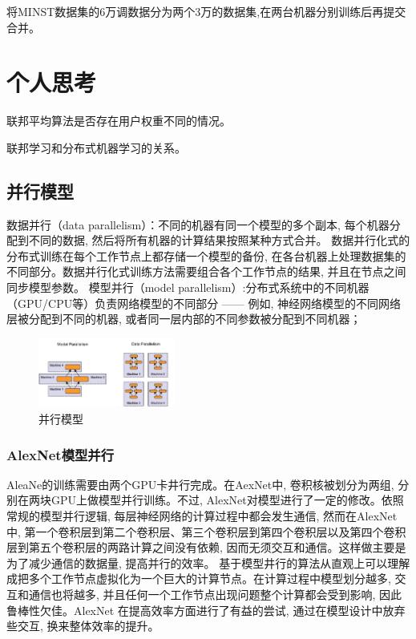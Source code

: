 \documentclass[a4paper]{article}
\begin{document}
将MINST数据集的6万调数据分为两个3万的数据集,在两台机器分别训练后再提交合并。
 
\section{个人思考}
联邦平均算法是否存在用户权重不同的情况。

联邦学习和分布式机器学习的关系。


\subsection{并行模型}

数据并行（data parallelism）：不同的机器有同一个模型的多个副本, 每个机器分配到不同的数据, 然后将所有机器的计算结果按照某种方式合并。
数据并行化式的分布式训练在每个工作节点上都存储一个模型的备份, 在各台机器上处理数据集的不同部分。数据并行化式训练方法需要组合各个工作节点的结果, 并且在节点之间同步模型参数。
模型并行（model parallelism）:分布式系统中的不同机器（GPU/CPU等）负责网络模型的不同部分 —— 例如, 神经网络模型的不同网络层被分配到不同的机器, 或者同一层内部的不同参数被分配到不同机器；
\begin{figure}[!ht]
    \center
\includegraphics[width=0.4\textwidth]{paralle.png}
\caption{并行模型}
\label{parallelism}
\end{figure}


\subsubsection{AlexNet模型并行}
AleaNe的训练需要由两个GPU卡井行完成。在AexNet中, 卷积核被划分为两组, 分别在两块GPU上做模型并行训练。不过, AlexNet对模型进行了一定的修改。依照常规的模型并行逻辑, 每层神经网络的计算过程中都会发生通信, 然而在AlexNet中, 第一个卷积层到第二个卷积层、第三个卷积层到第四个卷积层以及第四个卷积层到第五个卷积层的两路计算之间没有依赖, 因而无须交互和通信。这样做主要是为了减少通信的数据量, 提高并行的效率。
基于模型井行的算法从直观上可以理解成把多个工作节点虚拟化为一个巨大的计算节点。在计算过程中模型划分越多, 交互和通信也将越多, 并且任何一个工作节点出现问题整个计算都会受到影响, 因此鲁棒性欠佳。AlexNet 在提高效率方面进行了有益的尝试, 通过在模型设计中放弃些交互, 换来整体效率的提升。
\end{document}
